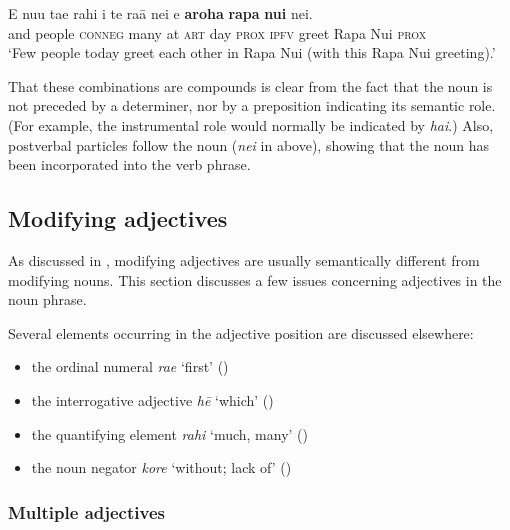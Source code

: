 \ea\label{ex:5.134}
\gll {\ꞌ}E nu{\ꞌ}u ta{\ꞌ}e rahi {\ꞌ}i te ra{\ꞌ}ā nei e \textbf{{\ꞌ}aroha} \textbf{rapa} \textbf{nui} nei. \\
and people \textsc{conneg} many at \textsc{art} day \textsc{prox} \textsc{ipfv} greet Rapa Nui \textsc{prox} \\

\glt
‘Few people today greet each other in Rapa Nui (with this Rapa Nui greeting).’ \textstyleExampleref{[R530.038]} 
\z

That these combinations are compounds is clear from the fact that the noun is not preceded by a determiner, nor by a preposition indicating its semantic role. (For example, the instrumental role would normally be indicated by \textit{hai}.) Also, postverbal particles follow the noun (\textit{nei} in  above), showing that the noun has been incorporated into the verb phrase.
\subsection{Modifying adjectives}\label{sec:5.7.3}
As discussed in , modifying adjectives are usually semantically different from modifying nouns. This section discusses a few issues concerning adjectives in the noun phrase.

Several elements occurring in the adjective position are discussed elsewhere:

\begin{itemize}
\item 
the ordinal numeral \textit{ra{\ꞌ}e} ‘first’ ()

\item 
the interrogative adjective \textit{h}\textit{ē} ‘which’ ()

\item 
the quantifying element \textit{rahi} ‘much, many’ ()

\item 
the noun negator \textit{kore} ‘without; lack of’ ()

\end{itemize}
\subsubsection[Multiple adjectives]{Multiple adjectives}\label{sec:5.7.3.1}

